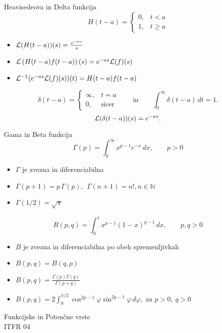 \documentclass[a4paper,10pt]{article}
\begin{document}
\begin{multicols}{2}
\begin{formulaBox}{Heavisedeova in Delta funkcija}
	$$
		H(t-a) = \left\{ \begin{array}{rl}
		0, & t<a\\
		1, & t \ge a
		\end{array} 
		\right.    
		$$   
		\begin{itemize}
			\item ${\cal L}(H(t-a))(s) =  \frac{e^{-as}}{s}$
			\item ${\cal L}\left(H(t-a) f(t-a)\right)(s)= e^{-as}{\cal L}(f)(s)$
			\item ${\cal L}^{-1}(e^{-as} {\cal L}(f)(s))(t) = H(t-a) f(t-a)$
		\end{itemize}
	$$
	\delta (t-a) = \left\{ \begin{array}{rl}
		\infty, & t=a\\ 
		0,  & \mbox{sicer}
	\end{array}
	\right. 
	\qquad \mbox{in}  \qquad 
	\int_0^\infty \delta(t-a) \,dt = 1.
	$$                    
		$$                         
		{\cal L}( \delta(t-a))(s) =  e^{-as}.
		$$  
\end{formulaBox}

\begin{formulaBox}{Gama in Beta funkcija}
		\[   \Gamma (p) = \int_0^\infty x^{p-1} e^{-x}\,dx, \qquad p>0
		\]

		\begin{itemize}
			\item $\Gamma$ je zvezna in diferenciabilna
			\item  $\Gamma(p+1) = p\, \Gamma(p), \ \ \Gamma(n+1)= n!, n\in \mathbb{N}$
			\item  $\Gamma(1/2) = \sqrt{\pi}$
		\end{itemize}

		\[  B(p,q) = \int_0^1 x^{p-1} (1-x)^{q-1}\,dx,\qquad p,q>0
		\]
		\begin{itemize}
			\item  $B$ je zvezna in diferenciabilna po obeh spremenljivkah
			\item  $B(p,q)= B(q,p)$ 
			\item  $\displaystyle B(p,q)=\frac{\Gamma(p)\Gamma(q)}{\Gamma(p+q)}$
			\item  $\displaystyle B(p,q) =  2 \int_0^{\pi/2} \cos^{2p-1}\varphi \sin^{2q-1}\varphi\,d\varphi, \mbox{ za } p>0,\ q>0$
		\end{itemize}
\end{formulaBox}

\begin{formulaBox}{Funkcijske in Potenčne vrste}
	\\
	ITFR 04
\end{formulaBox}


\end{multicols}
\end{document}
